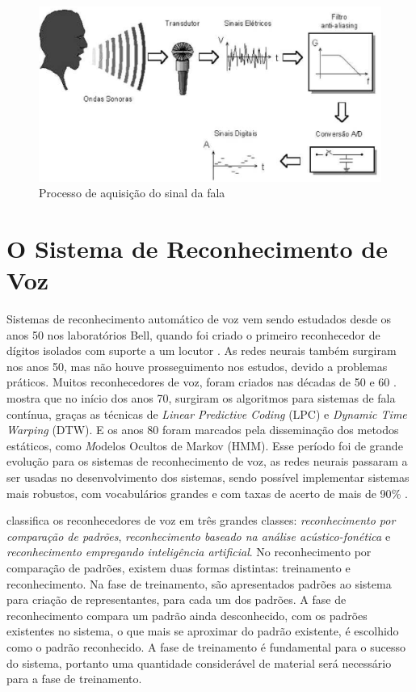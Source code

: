 \begin{figure}
\includegraphics[width=1\textwidth]{graficos/aquisicao_fala.eps}
\caption{Processo de aquisição do sinal da fala}
\end{figure}


\section{O Sistema de Reconhecimento de Voz}\label{sec:red_khn}

Sistemas de reconhecimento automático de voz vem sendo estudados desde os anos 50 nos laboratórios Bell, quando foi criado o primeiro reconhecedor de dígitos isolados com suporte a um locutor \cite{MetodosProAnderson}. As redes neurais também surgiram nos anos 50, mas não houve prosseguimento nos estudos, devido a problemas práticos. Muitos reconhecedores de voz, foram criados nas décadas de 50 e 60 \cite{RavSpeechSadaoki}.  mostra que no início dos anos 70, surgiram os algoritmos para sistemas de fala contínua, graças as técnicas de \textit{Linear Predictive Coding} (LPC) e \textit{Dynamic Time Warping} (DTW). E os anos 80 foram marcados pela disseminação dos metodos estáticos, como \textit Modelos Ocultos de Markov (HMM). Esse período foi de grande evolução para os sistemas de reconhecimento de voz, as redes neurais passaram a ser usadas no desenvolvimento dos sistemas, sendo possível implementar sistemas mais robustos, com vocabulários grandes e com taxas de acerto de mais de 90{\%} \cite{AvaliaTecJose}.

 classifica os reconhecedores de voz em três grandes classes: \textit{reconhecimento por comparação de padrões}, \textit{reconhecimento baseado na análise acústico-fonética} e \textit{reconhecimento empregando inteligência artificial}. No reconhecimento por comparação de padrões, existem duas formas distintas: treinamento e reconhecimento. Na fase de treinamento, são apresentados padrões ao sistema para criação de representantes, para cada um dos padrões. A fase de reconhecimento compara um padrão ainda desconhecido, com os padrões existentes no sistema, o que mais se aproximar do padrão existente, é escolhido como o padrão reconhecido. A fase de treinamento é fundamental para o sucesso do sistema, portanto uma quantidade considerável de material será necessário para a fase de treinamento. 


